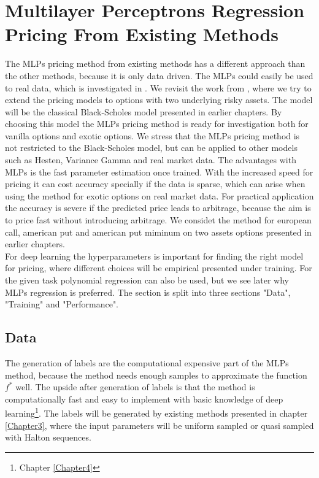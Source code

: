 \section{Multilayer Perceptrons Regression Pricing From Existing Methods}
The MLPs pricing method from existing methods has a different approach than the other methods, because it is only data driven. The MLPs could easily be used to real data, which is investigated in \parencite{GasparRaquel20}. We revisit the work from \parencite{HirsaAli2019}, where we try to extend the pricing models to options with two underlying risky assets. The model will be the classical Black-Scholes model presented in earlier chapters. By choosing this model the MLPs pricing method is ready for investigation both for vanilla options and exotic options. We stress that the MLPs pricing method is not restricted to the Black-Scholes model, but can be applied to other models such as Hesten, Variance Gamma and real market data. The advantages with MLPs is the fast parameter estimation once trained. With the increased speed for pricing it can cost accuracy specially if the data is sparse, which can arise when using the method for exotic options on real market data. For practical application the accuracy is severe if the predicted price leads to arbitrage, because the aim is to price fast without introducing arbitrage. We considet the method for european call, american put and american put miminum on two assets options presented in earlier chapters.\\

For deep learning the hyperparameters is important for finding the right model for pricing, where different choices will be empirical presented under training. For the given task polynomial regression can also be used, but we see later why MLPs regression is preferred. The section is split into three sections "Data", "Training" and "Performance".

\subsection{Data}
The generation of labels are the computational expensive part of the MLPs method, because the method needs enough samples to approximate the function $f^*$ well. The upside after generation of labels is that the method is computationally fast and easy to implement with basic knowledge of deep learning\footnote{Chapter \ref{Chapter4}}. The labels will be generated by existing methods presented in chapter \ref{Chapter3}, where the input parameters will be uniform sampled or quasi sampled with Halton sequences.\\

